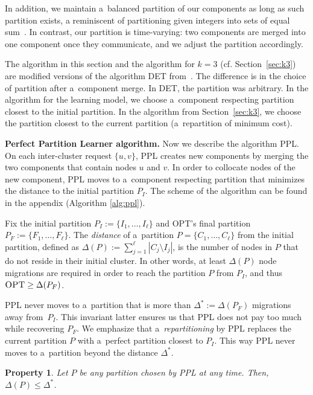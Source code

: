 \documentclass[a4paper,anonymous,USenglish]{lipics-v2019}
\newcommand{\OPT}{\textsc{OPT}\xspace}
\newcommand{\PPL}{\textsc{PPL}\xspace}
\newtheorem{property}{Property}
\begin{document}
In addition,
we maintain a~balanced partition of our components as long as such partition exists,
a reminiscent of partitioning given integers into sets of equal sum~\cite{integer-partitions-book}.
In contrast, our partition is time-varying:  two components are merged into one component once they communicate, and we adjust the partition accordingly.



The algorithm in this section and the algorithm for $k=3$ (cf. Section~\ref{sec:k3}) are modified versions of the algorithm DET from~\cite{repartition-disc}.
The difference is in the choice of partition after a~component merge.
In DET, the partition was arbitrary.
In the algorithm for the learning model,
we choose a~component respecting partition closest to the initial partition.
In the algorithm from Section~\ref{sec:k3}, we choose the partition closest to the current partition (a~repartition of minimum cost).


\noindent
\textbf{Perfect Partition Learner algorithm.}
Now we describe the algorithm \PPL.
On each inter-cluster request $\{u,v\}$, 
\PPL creates new components by merging
 the two components that contain nodes $u$ and $v$.
In order to collocate nodes of the new component,
\PPL moves to a~component respecting partition that minimizes the distance to the initial partition $P_I$.
The scheme of the algorithm can be found in the  appendix (Algorithm \ref{alg:ppl}).


Fix the initial partition
$P_I :=\{ I_1, \dots, I_{\ell}\}$ and \OPT's final partition
$P_F := \{F_1, \dots, F_{\ell}\}$.
The \emph{distance} of a~partition
 $P = \{C_1, \dots, C_{\ell}\}$ from the initial partition,
defined as 
$\Delta(P) := \sum_{j=1}^{\ell} | C_j \setminus I_j |$,
 is the number of nodes in $P$ that do not reside in their initial cluster.
In other words,
at least $\Delta(P)$ node migrations are required in order to reach the partition $P$ from $P_I$, and thus
$\OPT \geq \Delta(P_F) $.

\PPL never moves to a~partition that is more than $ \Delta^*:= \Delta(P_F) $   migrations away from~$P_I$.
This invariant latter ensures us that \PPL does not pay too much while recovering $P_F$.
We emphasize that a~\emph{repartitioning} by \PPL replaces the current partition $P$ with a~perfect partition closest to $P_I$.
This way \PPL never moves to a~partition beyond the distance $\Delta^*$.

\begin{property} \label{prop:dist<OPT}
	Let $P$ be any partition chosen by \PPL at any time.
	Then, $\Delta(P) \leq \Delta^*$.	
\end{property}
\end{document}
